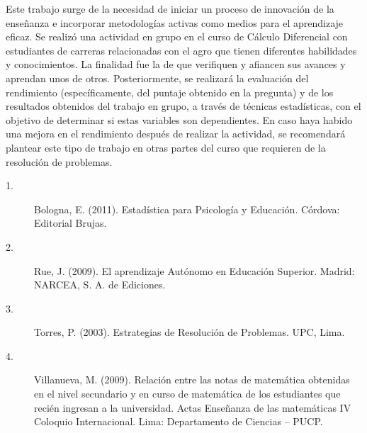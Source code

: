 Este trabajo surge de la necesidad de iniciar un proceso de innovación
de la enseñanza e incorporar metodologías activas como medios para
el aprendizaje eficaz. Se realizó una actividad en grupo en el curso
de Cálculo Diferencial con estudiantes de carreras relacionadas con
el agro que tienen diferentes habilidades y conocimientos. La finalidad
fue la de que verifiquen y afiancen sus avances y aprendan unos de
otros. Posteriormente, se realizará la evaluación del rendimiento
(específicamente, del puntaje obtenido en la pregunta) y de los resultados
obtenidos del trabajo en grupo, a través de técnicas estadísticas,
con el objetivo de determinar si estas variables son dependientes.
En caso haya habido una mejora en el rendimiento después de realizar
la actividad, se recomendará plantear este tipo de trabajo en otras
partes del curso que requieren de la resolución de problemas. 
\begin{description}
\item [{1.}] Bologna, E. (2011). Estadística para Psicología y Educación.
Córdova: Editorial Brujas.
\item [{2.}] Rue, J. (2009). El aprendizaje Autónomo en Educación Superior.
Madrid: NARCEA, S. A. de Ediciones.
\item [{3.}] Torres, P. (2003). Estrategias de Resolución de Problemas.
UPC, Lima. 
\item [{4.}] Villanueva, M. (2009). Relación entre las notas de matemática
obtenidas en el nivel secundario y en curso de matemática de los estudiantes
que recién ingresan a la universidad. Actas Enseñanza de las matemáticas
IV Coloquio Internacional. Lima: Departamento de Ciencias – PUCP.\end{description}


